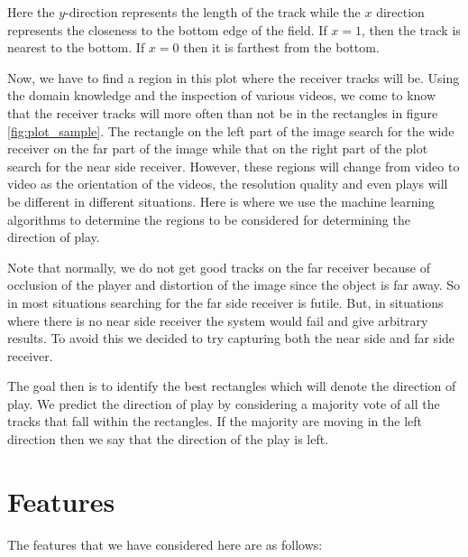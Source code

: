 \documentclass{article} %
\begin{document}
Here the $y$-direction represents the length of the track while the $x$ direction represents the closeness to the bottom edge of the field. If $x = 1$, then the track is nearest to the bottom. If $x = 0$ then it is farthest from the bottom.

Now, we have to find a region in this plot where the receiver tracks will be. Using the domain knowledge and the inspection of various videos, we come to know that the receiver tracks will more often than not be in the rectangles in figure \ref{fig:plot_sample}. The rectangle on the left part of the image search for the wide receiver on the far part of the image while that on the right part of the plot search for the near side receiver. However, these regions will change from video to video as the orientation of the videos, the resolution quality and even plays will be different in different situations. Here is where we use the machine learning algorithms to determine the regions to be considered for determining the direction of play. 

Note that normally, we do not get good tracks on the far receiver because of occlusion of the player and distortion of the image since the object is far away. So in most situations searching for the far side receiver is futile. But, in situations where there is no near side receiver the system would fail and give arbitrary results. To avoid this we decided to try capturing both the near side and far side receiver.

The goal then is to identify the best rectangles which will denote the direction of play. We predict the direction of play by considering a majority vote of all the tracks that fall within the rectangles. If the majority are moving in the left direction then we say that the direction of the play is left.

\section{Features}

The features that we have considered here are as follows:
\end{document}
